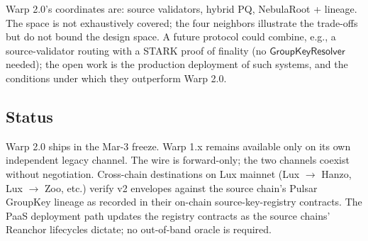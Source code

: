Warp 2.0's coordinates are: source validators, hybrid PQ, NebulaRoot + lineage. The space is not exhaustively covered; the four neighbors illustrate the trade-offs but do not bound the design space. A future protocol could combine, e.g., a source-validator routing with a STARK proof of finality (no $\mathsf{GroupKeyResolver}$ needed); the open work is the production deployment of such systems, and the conditions under which they outperform Warp 2.0.

\subsection{Status}

Warp 2.0 ships in the Mar-3 freeze. Warp 1.x remains available only on its own independent legacy channel. The wire is forward-only; the two channels coexist without negotiation. Cross-chain destinations on Lux mainnet (Lux $\to$ Hanzo, Lux $\to$ Zoo, etc.) verify v2 envelopes against the source chain's Pulsar GroupKey lineage as recorded in their on-chain source-key-registry contracts. The PaaS deployment path \cite{lp105} updates the registry contracts as the source chains' Reanchor lifecycles dictate; no out-of-band oracle is required.

